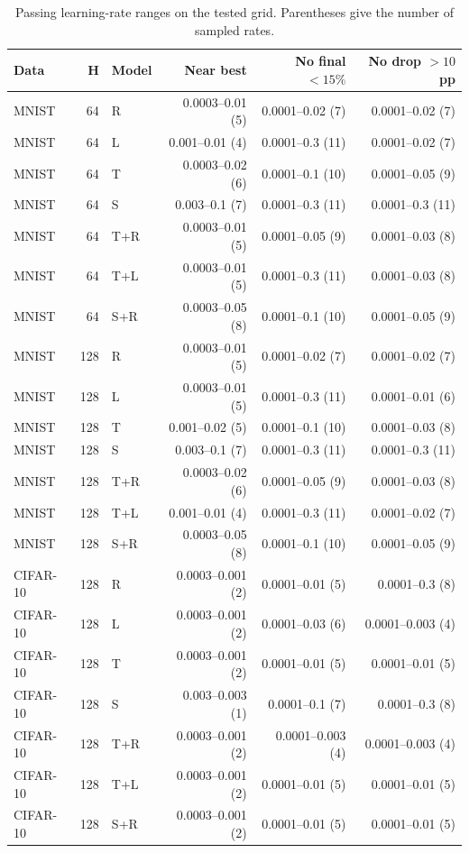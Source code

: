\begin{table}[htbp]
\centering
\caption{Passing learning-rate ranges on the tested grid. Parentheses give the number of sampled rates.}
\label{tab:windows}
\footnotesize
\begin{tabular}{@{}lrlrrr@{}}
\toprule
Data & H & Model & Near best & No final $<15\%$ & No drop $>10$ pp \\
\midrule
MNIST & 64 & R & 0.0003--0.01 (5) & 0.0001--0.02 (7) & 0.0001--0.02 (7) \\
MNIST & 64 & L & 0.001--0.01 (4) & 0.0001--0.3 (11) & 0.0001--0.02 (7) \\
MNIST & 64 & T & 0.0003--0.02 (6) & 0.0001--0.1 (10) & 0.0001--0.05 (9) \\
MNIST & 64 & S & 0.003--0.1 (7) & 0.0001--0.3 (11) & 0.0001--0.3 (11) \\
MNIST & 64 & T+R & 0.0003--0.01 (5) & 0.0001--0.05 (9) & 0.0001--0.03 (8) \\
MNIST & 64 & T+L & 0.0003--0.01 (5) & 0.0001--0.3 (11) & 0.0001--0.03 (8) \\
MNIST & 64 & S+R & 0.0003--0.05 (8) & 0.0001--0.1 (10) & 0.0001--0.05 (9) \\
MNIST & 128 & R & 0.0003--0.01 (5) & 0.0001--0.02 (7) & 0.0001--0.02 (7) \\
MNIST & 128 & L & 0.0003--0.01 (5) & 0.0001--0.3 (11) & 0.0001--0.01 (6) \\
MNIST & 128 & T & 0.001--0.02 (5) & 0.0001--0.1 (10) & 0.0001--0.03 (8) \\
MNIST & 128 & S & 0.003--0.1 (7) & 0.0001--0.3 (11) & 0.0001--0.3 (11) \\
MNIST & 128 & T+R & 0.0003--0.02 (6) & 0.0001--0.05 (9) & 0.0001--0.03 (8) \\
MNIST & 128 & T+L & 0.001--0.01 (4) & 0.0001--0.3 (11) & 0.0001--0.02 (7) \\
MNIST & 128 & S+R & 0.0003--0.05 (8) & 0.0001--0.1 (10) & 0.0001--0.05 (9) \\
CIFAR-10 & 128 & R & 0.0003--0.001 (2) & 0.0001--0.01 (5) & 0.0001--0.3 (8) \\
CIFAR-10 & 128 & L & 0.0003--0.001 (2) & 0.0001--0.03 (6) & 0.0001--0.003 (4) \\
CIFAR-10 & 128 & T & 0.0003--0.001 (2) & 0.0001--0.01 (5) & 0.0001--0.01 (5) \\
CIFAR-10 & 128 & S & 0.003--0.003 (1) & 0.0001--0.1 (7) & 0.0001--0.3 (8) \\
CIFAR-10 & 128 & T+R & 0.0003--0.001 (2) & 0.0001--0.003 (4) & 0.0001--0.003 (4) \\
CIFAR-10 & 128 & T+L & 0.0003--0.001 (2) & 0.0001--0.01 (5) & 0.0001--0.01 (5) \\
CIFAR-10 & 128 & S+R & 0.0003--0.001 (2) & 0.0001--0.01 (5) & 0.0001--0.01 (5) \\
\bottomrule
\end{tabular}
\par{}
\end{table}
